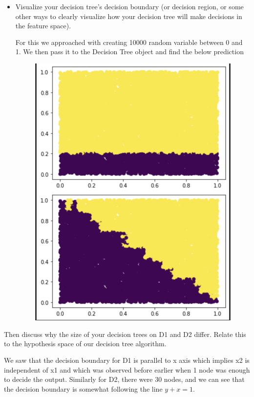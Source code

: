 \documentclass[a4paper]{article}
\theoremstyle{definition}
\newenvironment{soln}{
    \leavevmode\color{blue}\ignorespaces
}{}
\begin{document}
\begin{enumerate}
\begin{itemize}
  \item Visualize your decision tree's decision boundary (or decision region, or some other ways to clearly visualize how your decision tree will make decisions in the feature space).
  
\begin{soln}
For this we approached with creating 10000 random variable between 0 and 1. We then pass it to the Decision Tree object and find the below prediction
    \begin{figure}[H]
            \centering
            \includegraphics[scale=0.5]{datatest.png}
            \label{fig:q2}
        \end{figure}
\end{soln}
  \end{itemize}
Then discuss why the size of your decision trees on D1 and D2 differ.  Relate this to the hypothesis space of our decision tree algorithm. \\
\begin{soln}
    We saw that the decision boundary for D1 is parallel to x axis which implies x2 is independent of x1 and which was observed before earlier when 1 node was enough to decide the output.
    Similarly for D2, there were 30 nodes, and we can see that the decision boundary is somewhat following the line
    $y+x=1$.
\end{soln}


\end{enumerate}
\end{document}
